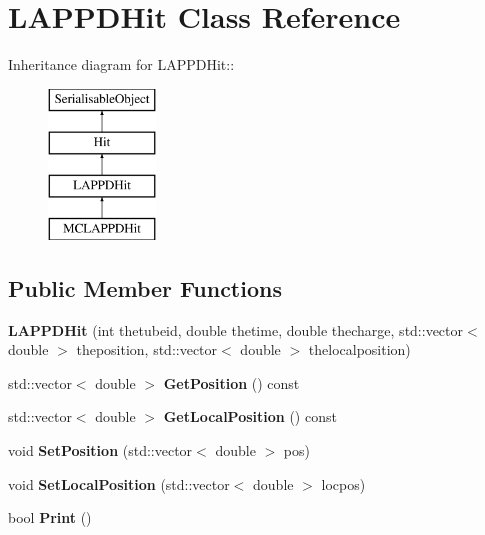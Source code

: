 \hypertarget{classLAPPDHit}{
\section{LAPPDHit Class Reference}
\label{classLAPPDHit}
}
Inheritance diagram for LAPPDHit::\begin{figure}[H]
\begin{center}
\leavevmode
\includegraphics[height=4cm]{classLAPPDHit}
\end{center}
\end{figure}
\subsection*{Public Member Functions}
\begin{DoxyCompactItemize}
\item 
\hypertarget{classLAPPDHit_afe5f8ccfdc8ea9c3cbf1ceb9c441e71d}{
{\bfseries LAPPDHit} (int thetubeid, double thetime, double thecharge, std::vector$<$ double $>$ theposition, std::vector$<$ double $>$ thelocalposition)}
\label{classLAPPDHit_afe5f8ccfdc8ea9c3cbf1ceb9c441e71d}

\item 
\hypertarget{classLAPPDHit_ae1828d2ea7a97bc4fea858aaf94cedb4}{
std::vector$<$ double $>$ {\bfseries GetPosition} () const }
\label{classLAPPDHit_ae1828d2ea7a97bc4fea858aaf94cedb4}

\item 
\hypertarget{classLAPPDHit_a9d1c4249ca261677004dbb0ea65effb1}{
std::vector$<$ double $>$ {\bfseries GetLocalPosition} () const }
\label{classLAPPDHit_a9d1c4249ca261677004dbb0ea65effb1}

\item 
\hypertarget{classLAPPDHit_acddccb2ec31fd46be236b32ede3a783b}{
void {\bfseries SetPosition} (std::vector$<$ double $>$ pos)}
\label{classLAPPDHit_acddccb2ec31fd46be236b32ede3a783b}

\item 
\hypertarget{classLAPPDHit_a21e01043d24da9974933bbcfa2d23d3c}{
void {\bfseries SetLocalPosition} (std::vector$<$ double $>$ locpos)}
\label{classLAPPDHit_a21e01043d24da9974933bbcfa2d23d3c}

\item 
\hypertarget{classLAPPDHit_af993f8cd1441e7a37e8e1ca0e6890654}{
bool {\bfseries Print} ()}
\label{classLAPPDHit_af993f8cd1441e7a37e8e1ca0e6890654}

\end{DoxyCompactItemize}
